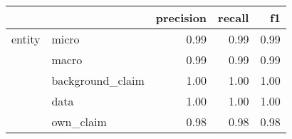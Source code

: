 \begin{tabular}{llrrr}
\toprule
       &           &  precision &  recall &   f1 \\
\midrule
entity & micro &       0.99 &    0.99 & 0.99 \\
       & macro &       0.99 &    0.99 & 0.99 \\
       & background\_claim &       1.00 &    1.00 & 1.00 \\
       & data &       1.00 &    1.00 & 1.00 \\
       & own\_claim &       0.98 &    0.98 & 0.98 \\
\bottomrule
\end{tabular}
